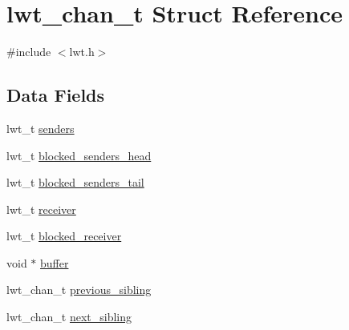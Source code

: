 \hypertarget{structlwt__channel}{\section{lwt\+\_\+chan\+\_\+t Struct Reference}
\label{structlwt__channel}
}


{\ttfamily \#include $<$lwt.\+h$>$}

\subsection*{Data Fields}
\begin{DoxyCompactItemize}
\item 
lwt\+\_\+t \hyperlink{structlwt__channel_a20bba68264c7fd15c6efb8446821d16e}{senders}
\item 
lwt\+\_\+t \hyperlink{structlwt__channel_a34b43c8980f830472deb0cc60a632257}{blocked\+\_\+senders\+\_\+head}
\item 
lwt\+\_\+t \hyperlink{structlwt__channel_ad2912304612b27ba7a7b5dd2ec3e2415}{blocked\+\_\+senders\+\_\+tail}
\item 
lwt\+\_\+t \hyperlink{structlwt__channel_a740680d836200bfc87150333e4d62785}{receiver}
\item 
lwt\+\_\+t \hyperlink{structlwt__channel_ac296e81a0c3bfdccbc1a8c1f89651008}{blocked\+\_\+receiver}
\item 
void $\ast$ \hyperlink{structlwt__channel_a3ab113fcf44dd32e83447f80a9111aa1}{buffer}
\item 
lwt\+\_\+chan\+\_\+t \hyperlink{structlwt__channel_a62840bc52e01e67e063776f8205dd43e}{previous\+\_\+sibling}
\item 
lwt\+\_\+chan\+\_\+t \hyperlink{structlwt__channel_a4b5e95b483446613dabd96de3dec4007}{next\+\_\+sibling}
\end{DoxyCompactItemize}


